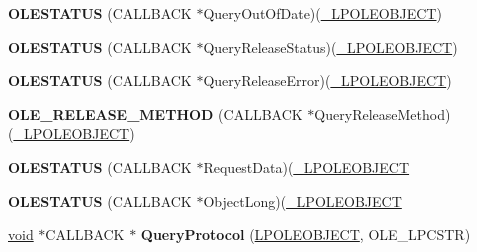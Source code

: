 \begin{DoxyCompactItemize}
\mbox{\label{struct___o_l_e_o_b_j_e_c_t_v_t_b_l_aab8664426fe4685816cf24c4f3ccb9fe}} 
{\bfseries O\+L\+E\+S\+T\+A\+T\+US} (C\+A\+L\+L\+B\+A\+CK $\ast$Query\+Out\+Of\+Date)(\hyperlink{struct___o_l_e_o_b_j_e_c_t}{\+\_\+\+L\+P\+O\+L\+E\+O\+B\+J\+E\+CT})
\item 
\mbox{\label{struct___o_l_e_o_b_j_e_c_t_v_t_b_l_a5b9b13dc090cd0a6fca24ffc2086b60e}} 
{\bfseries O\+L\+E\+S\+T\+A\+T\+US} (C\+A\+L\+L\+B\+A\+CK $\ast$Query\+Release\+Status)(\hyperlink{struct___o_l_e_o_b_j_e_c_t}{\+\_\+\+L\+P\+O\+L\+E\+O\+B\+J\+E\+CT})
\item 
\mbox{\label{struct___o_l_e_o_b_j_e_c_t_v_t_b_l_a2e343980f1f98a340fc039c179bc161e}} 
{\bfseries O\+L\+E\+S\+T\+A\+T\+US} (C\+A\+L\+L\+B\+A\+CK $\ast$Query\+Release\+Error)(\hyperlink{struct___o_l_e_o_b_j_e_c_t}{\+\_\+\+L\+P\+O\+L\+E\+O\+B\+J\+E\+CT})
\item 
\mbox{\label{struct___o_l_e_o_b_j_e_c_t_v_t_b_l_a5565ad405b8a926d6cabb3b9b23ae091}} 
{\bfseries O\+L\+E\+\_\+\+R\+E\+L\+E\+A\+S\+E\+\_\+\+M\+E\+T\+H\+OD} (C\+A\+L\+L\+B\+A\+CK $\ast$Query\+Release\+Method)(\hyperlink{struct___o_l_e_o_b_j_e_c_t}{\+\_\+\+L\+P\+O\+L\+E\+O\+B\+J\+E\+CT})
\item 
\mbox{\label{struct___o_l_e_o_b_j_e_c_t_v_t_b_l_ac0232e51ba09664e6109f69d1a642d24}} 
{\bfseries O\+L\+E\+S\+T\+A\+T\+US} (C\+A\+L\+L\+B\+A\+CK $\ast$Request\+Data)(\hyperlink{struct___o_l_e_o_b_j_e_c_t}{\+\_\+\+L\+P\+O\+L\+E\+O\+B\+J\+E\+CT}
\item 
\mbox{\label{struct___o_l_e_o_b_j_e_c_t_v_t_b_l_a182e5c5cedf741d25dbccc8344f9a438}} 
{\bfseries O\+L\+E\+S\+T\+A\+T\+US} (C\+A\+L\+L\+B\+A\+CK $\ast$Object\+Long)(\hyperlink{struct___o_l_e_o_b_j_e_c_t}{\+\_\+\+L\+P\+O\+L\+E\+O\+B\+J\+E\+CT}
\item 
\mbox{\label{struct___o_l_e_o_b_j_e_c_t_v_t_b_l_a12bb6386c5a7495b2c5f631325ccfa27}} 
\hyperlink{interfacevoid}{void} $\ast$C\+A\+L\+L\+B\+A\+CK $\ast$ {\bfseries Query\+Protocol} (\hyperlink{struct___o_l_e_o_b_j_e_c_t}{L\+P\+O\+L\+E\+O\+B\+J\+E\+CT}, O\+L\+E\+\_\+\+L\+P\+C\+S\+TR)

\end{DoxyCompactItemize}
